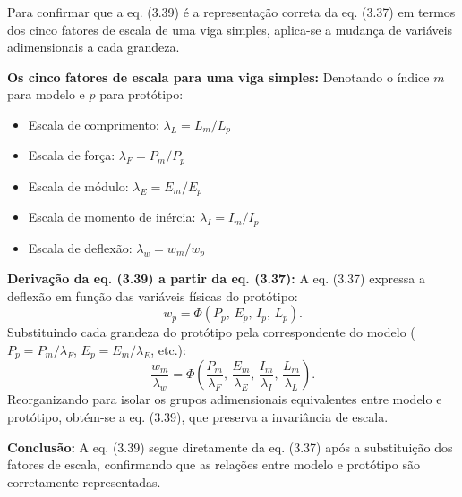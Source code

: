 Para confirmar que a eq. (3.39) é a representação correta da eq. (3.37) em termos dos cinco fatores de escala de uma viga simples, aplica-se a mudança de variáveis adimensionais a cada grandeza.

\textbf{Os cinco fatores de escala para uma viga simples:}
Denotando o índice $m$ para modelo e $p$ para protótipo:
\begin{itemize}
\item Escala de comprimento: $\lambda_L = L_m/L_p$
\item Escala de força: $\lambda_F = P_m/P_p$
\item Escala de módulo: $\lambda_E = E_m/E_p$
\item Escala de momento de inércia: $\lambda_I = I_m/I_p$
\item Escala de deflexão: $\lambda_w = w_m/w_p$
\end{itemize}

\textbf{Derivação da eq. (3.39) a partir da eq. (3.37):}
A eq. (3.37) expressa a deflexão em função das variáveis físicas do protótipo:
\[
w_p = \Phi(P_p,\,E_p,\,I_p,\,L_p).
\]
Substituindo cada grandeza do protótipo pela correspondente do modelo ($P_p = P_m/\lambda_F$, $E_p = E_m/\lambda_E$, etc.):
\[
\frac{w_m}{\lambda_w} = \Phi\!\left(\frac{P_m}{\lambda_F},\,\frac{E_m}{\lambda_E},\,\frac{I_m}{\lambda_I},\,\frac{L_m}{\lambda_L}\right).
\]
Reorganizando para isolar os grupos adimensionais equivalentes entre modelo e protótipo, obtém-se a eq. (3.39), que preserva a invariância de escala.

\textbf{Conclusão:} A eq. (3.39) segue diretamente da eq. (3.37) após a substituição dos fatores de escala, confirmando que as relações entre modelo e protótipo são corretamente representadas.

